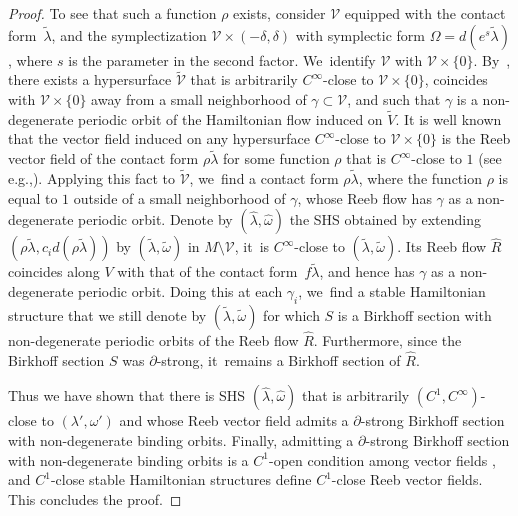 \documentclass[11pt]{article}
\newcommand{\eg}{e.g.,\xspace}
\theoremstyle{definition}
\begin{document}
\begin{proof}
To see that such a function $\rho$ exists, consider $\mathcal V$ equipped with the contact form~$\widetilde\lambda$, and the symplectization $\mathcal V\times (-\delta,\delta)$ with symplectic form $\Omega= d(e^s\widetilde\lambda)$, where $s$ is the parameter in the second factor. We~identify $\mathcal V$ with $\mathcal V\times \{0\}$. By~\cite[Lem.\,19]{Ro}, there exists a hypersurface $\widetilde{\mathcal V}$ that is arbitrarily $C^\infty$-close to $\mathcal V\times \{0\}$, coincides with $\mathcal V\times \{0\}$ away from a small neighborhood of $\gamma\subset \mathcal V$, and such that $\gamma$ is a non-degenerate periodic orbit of the Hamiltonian flow induced on $\widetilde V$. It is well known that the vector field induced on any hypersurface $C^\infty$-close to $\mathcal V\times \{0\}$ is the Reeb vector field of the contact form $\rho \widetilde\lambda$ for some function $\rho$ that is $C^\infty$-close to $1$ (see \eg \cite[\S 6]{HWZ2}). Applying this fact to $\widetilde{\mathcal V}$, we~find a contact form $\rho \widetilde \lambda$, where the function $\rho$ is equal to $1$ outside of a small neighborhood of $\gamma$, whose Reeb flow has $\gamma$ as a non-degenerate periodic orbit. Denote by $(\hat \lambda, \hat \omega)$ the SHS obtained by extending $(\rho \widetilde \lambda, c_i d(\rho \widetilde \lambda))$ by $(\widetilde \lambda,\widetilde \omega)$ in $M\setminus \mathcal V$, it~is $C^\infty$-close to $(\widetilde \lambda,\widetilde \omega)$. Its Reeb flow $\hat R$ coincides along $V$ with that of the contact form~$f\widetilde \lambda$, and hence has $\gamma$ as a non-degenerate periodic orbit. Doing this at each $\gamma_i$, we~find a stable Hamiltonian structure that we still denote by $(\widetilde \lambda, \widetilde \omega)$ for which $S$ is a Birkhoff section with non-degenerate periodic orbits of the Reeb flow $\hat R$. Furthermore, since the Birkhoff section $S$ was $\partial$-strong, it~remains a Birkhoff section of $\hat R$.

Thus we have shown that there is SHS $(\hat \lambda,\hat \omega)$ that is arbitrarily $(C^1, C^\infty)$-close to $(\lambda',\omega')$ and whose Reeb vector field admits a $\partial$-strong Birkhoff section with non-degenerate binding orbits. Finally, admitting a $\partial$-strong Birkhoff section with non-degenerate binding orbits is a $C^1$-open condition among vector fields \cite[Prop.\,5.1]{CDHR}, and $C^1$-close stable Hamiltonian structures define $C^1$-close Reeb vector fields. This concludes the proof.
\end{proof}
\end{document}
